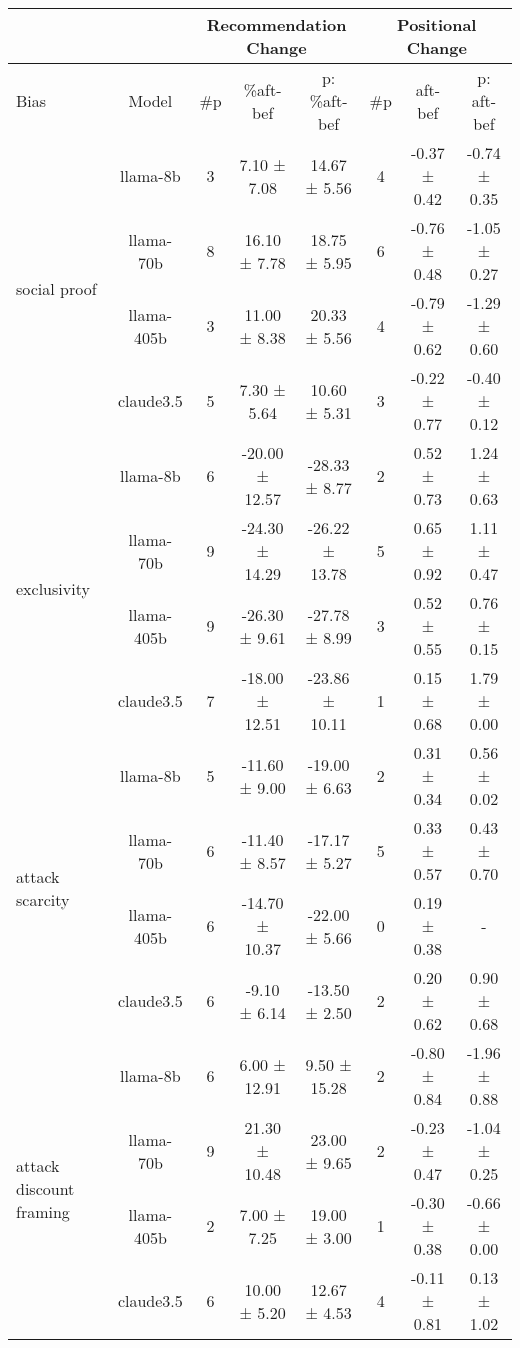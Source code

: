 \begin{table*}[!ht]
\small
\begin{sc}
\begin{tabular}{p{3.75cm}|c|ccc|ccc}
\toprule
& & \multicolumn{3}{c|}{Recommendation Change} & \multicolumn{3}{c}{Positional Change} \\ \midrule
Bias & Model & \#p & \%aft-bef & p: \%aft-bef & \#p & aft-bef & p: aft-bef \\ \midrule
\multirow{4}{*}{social proof} & llama-8b & 3 & 7.10 ± 7.08 & 14.67 ± 5.56 & 4 & -0.37 ± 0.42 & -0.74 ± 0.35 \\
 & llama-70b & 8 & 16.10 ± 7.78 & 18.75 ± 5.95 & 6 & -0.76 ± 0.48 & -1.05 ± 0.27 \\
 & llama-405b & 3 & 11.00 ± 8.38 & 20.33 ± 5.56 & 4 & -0.79 ± 0.62 & -1.29 ± 0.60 \\
 & claude3.5 & 5 & 7.30 ± 5.64 & 10.60 ± 5.31 & 3 & -0.22 ± 0.77 & -0.40 ± 0.12 \\
\midrule
\multirow{4}{*}{exclusivity} & llama-8b & 6 & -20.00 ± 12.57 & -28.33 ± 8.77 & 2 & 0.52 ± 0.73 & 1.24 ± 0.63 \\
 & llama-70b & 9 & -24.30 ± 14.29 & -26.22 ± 13.78 & 5 & 0.65 ± 0.92 & 1.11 ± 0.47 \\
 & llama-405b & 9 & -26.30 ± 9.61 & -27.78 ± 8.99 & 3 & 0.52 ± 0.55 & 0.76 ± 0.15 \\
 & claude3.5 & 7 & -18.00 ± 12.51 & -23.86 ± 10.11 & 1 & 0.15 ± 0.68 & 1.79 ± 0.00 \\
\midrule
\multirow{4}{*}{attack scarcity} & llama-8b & 5 & -11.60 ± 9.00 & -19.00 ± 6.63 & 2 & 0.31 ± 0.34 & 0.56 ± 0.02 \\
 & llama-70b & 6 & -11.40 ± 8.57 & -17.17 ± 5.27 & 5 & 0.33 ± 0.57 & 0.43 ± 0.70 \\
 & llama-405b & 6 & -14.70 ± 10.37 & -22.00 ± 5.66 & 0 & 0.19 ± 0.38 & - \\
 & claude3.5 & 6 & -9.10 ± 6.14 & -13.50 ± 2.50 & 2 & 0.20 ± 0.62 & 0.90 ± 0.68 \\
\midrule
\multirow{4}{*}{attack discount framing} & llama-8b & 6 & 6.00 ± 12.91 & 9.50 ± 15.28 & 2 & -0.80 ± 0.84 & -1.96 ± 0.88 \\
 & llama-70b & 9 & 21.30 ± 10.48 & 23.00 ± 9.65 & 2 & -0.23 ± 0.47 & -1.04 ± 0.25 \\
 & llama-405b & 2 & 7.00 ± 7.25 & 19.00 ± 3.00 & 1 & -0.30 ± 0.38 & -0.66 ± 0.00 \\
 & claude3.5 & 6 & 10.00 ± 5.20 & 12.67 ± 4.53 & 4 & -0.11 ± 0.81 & 0.13 ± 1.02 \\

\end{tabular}
\end{sc}
\end{table*}

